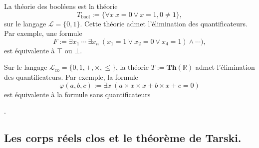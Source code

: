 \documentclass[./main]{subfiles}
\begin{document}
  \begin{exm}
    La théorie des booléens est la théorie \[
    T_\mathrm{bool} := \{\forall x \: x = 0 \lor x = 1 , 0 \neq 1\} 
    ,\] 
    sur le langage $\mathcal{L} = \{0,1\}$.
    Cette théorie admet l'élimination des quantificateurs. Par exemple, une formule \[
    F := \exists x_1 \: \cdots  \: \exists x_n \: (x_1 = 1 \lor x_2 = 0 \lor x_4 = 1) \land \cdots)
    ,\] est équivalente à $\top$ ou $\bot$.
  \end{exm}

  \begin{exm}
    Sur le langage $\mathcal{L}_\mathrm{co} = \{0, 1, +, \times, \le\}$, la théorie $T := \mathbf{Th}(\mathds{R})$ admet l'élimination des quantificateurs.
    Par exemple, la formule \[
    \varphi(a, b,c ) := \exists x \: (a \times x \times x + b \times x + c = 0)
    \] est équivalente à la formule sans quantificateurs 

    .
  \end{exm}

  \subsection{Les corps réels clos et le théorème de Tarski.}
\end{document}
